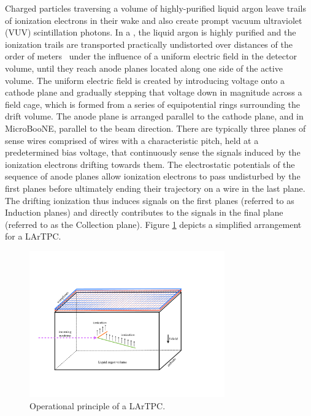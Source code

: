 Charged particles traversing a volume of highly-purified liquid argon leave trails of ionization electrons in their wake and also create prompt vacuum ultraviolet (VUV) scintillation photons.  In a \lartpc, the liquid argon is highly purified and the ionization trails are transported practically undistorted over distances of the order of meters~\cite{Aprile:1985} under the influence of a uniform electric field in the detector volume, until they reach anode planes located along one side of the active volume.   The uniform electric field is created by introducing voltage onto a cathode plane and gradually stepping that voltage down in magnitude across a field cage, which is formed from a series of equipotential rings surrounding the drift volume.  The anode plane is arranged parallel to the cathode plane, and in MicroBooNE, parallel to the beam direction.   There are typically three planes of sense wires comprised of wires with a characteristic pitch, held at a predetermined bias voltage, that continuously sense the signals induced by the ionization electrons drifting towards them. The electrostatic potentials of the sequence of anode planes allow ionization electrons to pass undisturbed by the first planes before ultimately ending their trajectory on a wire in the last plane. The drifting ionization thus induces signals on the first planes (referred to as Induction planes) and directly contributes to the signals in the final plane (referred to as the Collection plane).  Figure \ref{fig:lartpc} depicts a simplified arrangement for a LArTPC.


\begin{figure}
\centering 
\includegraphics[width=0.75\textwidth]{figures/my_tpc}
\caption{Operational principle of a LArTPC.}
\label{fig:lartpc}
\end{figure}


